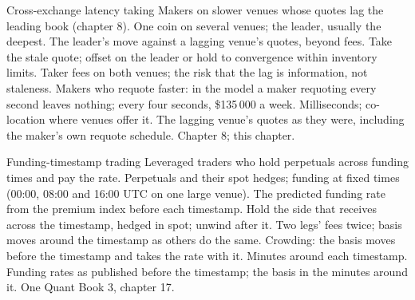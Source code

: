 \begin{strategyfile}{Cross-exchange latency taking}\label{strat:hf:crypto-high-frequency-trading-on-centralised-venues:taking}
 Makers on slower venues whose quotes lag the leading book (chapter 8).
 One coin on several venues; the leader, usually the deepest.
 The leader's move against a lagging venue's quotes, beyond fees.
 Take the stale quote; offset on the leader or hold to convergence within inventory limits.
 Taker fees on both venues; the risk that the lag is information, not staleness.
 Makers who requote faster: in the model a maker requoting every second leaves nothing; every four seconds, \$135\,000 a week.
 Milliseconds; co-location where venues offer it.
 The lagging venue's quotes as they were, including the maker's own requote schedule.
 Chapter 8; this chapter.
\end{strategyfile}

\begin{strategyfile}{Funding-timestamp trading}\label{strat:hf:crypto-high-frequency-trading-on-centralised-venues:funding}
 Leveraged traders who hold perpetuals across funding times and pay the rate.
 Perpetuals and their spot hedges; funding at fixed times (00:00, 08:00 and 16:00 UTC on one large venue).
 The predicted funding rate from the premium index before each timestamp.
 Hold the side that receives across the timestamp, hedged in spot; unwind after it.
 Two legs' fees twice; basis moves around the timestamp as others do the same.
 Crowding: the basis moves before the timestamp and takes the rate with it.
 Minutes around each timestamp.
 Funding rates as published before the timestamp; the basis in the minutes around it.
 One Quant Book 3, chapter 17.
\end{strategyfile}

